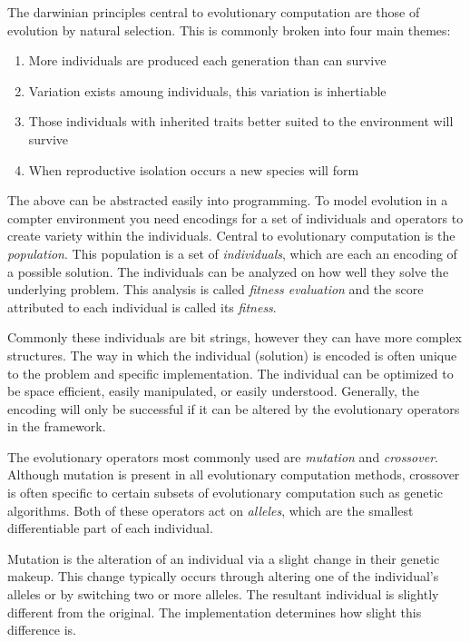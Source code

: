 \documentclass[10pt,letterpaper]{article}
\begin{document}
The darwinian principles central to evolutionary computation are those of evolution by natural selection. This is commonly broken into four main themes:
\begin{enumerate}
\item More individuals are produced each generation than can survive
\item Variation exists amoung individuals, this variation is inhertiable
\item Those individuals with inherited traits better suited to the environment will survive
\item When reproductive isolation occurs a new species will form
\end{enumerate}

The above can be abstracted easily into programming. To model evolution in a compter environment you need encodings for a set of individuals and operators to create variety within the individuals. Central to evolutionary computation is the \textit{population}. This population is a set of \textit{individuals}, which are each an encoding of a possible solution. The individuals can be analyzed on how well they solve the underlying problem. This analysis is called \textit{fitness evaluation} and the score attributed to each individual is called its \textit{fitness}.

Commonly these individuals are bit strings, however they can have more complex structures. The way in which the individual (solution) is encoded is often unique to the problem and specific implementation. The individual can be optimized to be space efficient, easily manipulated, or easily understood. Generally, the encoding will only be successful if it can be altered by the evolutionary operators in the framework. 

The evolutionary operators most commonly used are \textit{mutation} and \textit{crossover}. Although mutation is present in all evolutionary computation methods, crossover is often specific to certain subsets of evolutionary computation such as genetic algorithms. Both of these operators act on \textit{alleles}, which are the smallest differentiable part of each individual. %

Mutation is the alteration of an individual via a slight change in their genetic makeup. This change typically occurs through altering one of the individual's alleles or by switching two or more alleles. The resultant individual is slightly different from the original. The implementation determines how slight this difference is.
\end{document}
